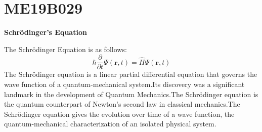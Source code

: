 \section{ME19B029}
\centerline{\textbf{Schr\"{o}dinger's Equation}}
The Schr\"{o}dinger Equation is as follows:
\begin{equation}
\hbar \frac{\partial}{\partial t}\Psi(\mathbf{r},t) = \hat H \Psi(\mathbf{r},t)
\end{equation}
The Schrödinger equation is a linear partial differential equation that governs the wave function of a quantum-mechanical system.Its discovery was a significant landmark in the development of Quantum Mechanics.The Schrödinger equation is the quantum counterpart of Newton's second law in classical mechanics.The Schrödinger equation gives the evolution over time of a wave function, the quantum-mechanical characterization of an isolated physical system.

